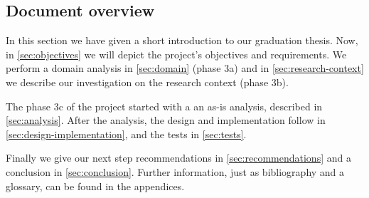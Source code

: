 
\subsection{Document overview}
In this section we have given a short introduction to our graduation thesis.
Now, in \autoref{sec:objectives} we will depict the project's objectives and requirements.
We perform a domain analysis in \autoref{sec:domain} (phase 3a) and in \autoref{sec:research-context} we describe our investigation on the research context (phase 3b).

The phase 3c of the project started with a an as-is analysis, described in \autoref{sec:analysis}.
After the analysis, the design and implementation follow in \autoref{sec:design-implementation}, and the tests in \autoref{sec:tests}.

Finally we give our next step recommendations in \autoref{sec:recommendations} and a conclusion in \autoref{sec:conclusion}.
Further information, just as bibliography and a glossary, can be found in the appendices.